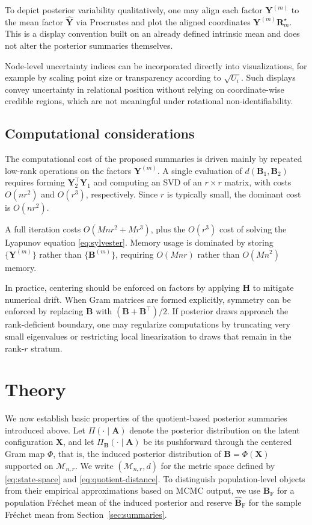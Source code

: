 \documentclass[12pt]{article}
\newcommand{\calMnr}{\mathcal{M}_{n,r}}
\newcommand{\bfA}{\boldsymbol{A}}
\newcommand{\bfB}{\boldsymbol{B}}
\newcommand{\bfH}{\boldsymbol{H}}
\newcommand{\bfR}{\boldsymbol{R}}
\newcommand{\bfX}{\boldsymbol{X}}
\newcommand{\bfY}{\boldsymbol{Y}}
\newcommand{\Frechet}{Fr\'{e}chet\xspace}
\newcommand{\BhatF}{\widehat{\bfB}_{\mathrm{F}}}
\newcommand{\BF}{\bfB_{\mathrm{F}}}
\begin{document}
To depict posterior variability qualitatively, one may align each factor $\bfY^{(m)}$ to the mean
factor $\hat{\bfY}$ via Procrustes and plot the aligned coordinates
$\bfY^{(m)}\bfR_m^\star$. This is a display convention built on an already defined intrinsic mean
and does not alter the posterior summaries themselves.

Node-level uncertainty indices can be incorporated directly into visualizations, for example by
scaling point size or transparency according to $\sqrt{U_i}$. Such displays convey uncertainty in
relational position without relying on coordinate-wise credible regions, which are not meaningful
under rotational non-identifiability.

\subsection{Computational considerations}\label{subsec:comp}

The computational cost of the proposed summaries is driven mainly by repeated low-rank operations on
the factors $\bfY^{(m)}$. A single evaluation of $d(\bfB_1,\bfB_2)$ requires forming
$\bfY_2^\top\bfY_1$ and computing an SVD of an $r\times r$ matrix, with costs $O(nr^2)$ and
$O(r^3)$, respectively. Since $r$ is typically small, the dominant cost is $O(nr^2)$.

A full iteration costs $O(Mnr^2+Mr^3)$, plus the $O(r^3)$ cost of
solving the Lyapunov equation \eqref{eq:sylvester}. Memory usage is dominated by storing
$\{\bfY^{(m)}\}$ rather than $\{\bfB^{(m)}\}$, requiring $O(Mnr)$ rather than $O(Mn^2)$ memory.

In practice, centering should be enforced on factors by applying $\bfH$ to mitigate numerical
drift. When Gram matrices are formed explicitly, symmetry can be enforced by replacing $\bfB$ with
$(\bfB+\bfB^\top)/2$. If posterior draws approach the rank-deficient boundary, one may regularize
computations by truncating very small eigenvalues or restricting local linearization to draws that
remain in the rank-$r$ stratum.


\section{Theory}\label{sec:theory}

We now establish basic properties of the quotient-based posterior summaries introduced above. Let
$\Pi(\cdot\mid \bfA)$ denote the posterior distribution on the latent configuration $\bfX$, and let
$\Pi_{\bfB}(\cdot\mid \bfA)$ be its pushforward through the centered Gram map $\Phi$, that is, the
induced posterior distribution of $\bfB=\Phi(\bfX)$ supported on $\calMnr$. We write
$(\calMnr,d)$ for the metric space defined by \eqref{eq:state-space} and
\eqref{eq:quotient-distance}. To distinguish population-level objects from their empirical
approximations based on MCMC output, we use $\BF$ for a population \Frechet mean of the induced
posterior and reserve $\BhatF$ for the sample \Frechet mean from
Section~\ref{sec:summaries}.
\end{document}
